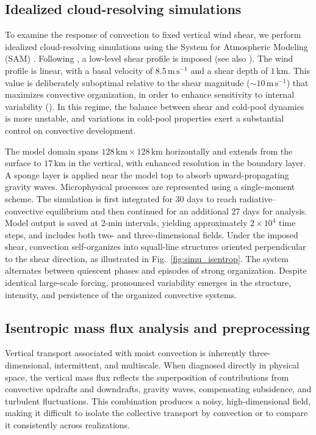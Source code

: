\documentclass[11pt]{article}
\begin{document}
\subsection{Idealized cloud-resolving simulations}

To examine the response of convection to fixed vertical wind shear, we perform idealized cloud-resolving simulations using the System for Atmospheric Modeling (SAM) \cite{khairoutdinov2003}. Following \cite{muller2013impact}, a low-level shear profile is imposed (see also \cite{rotunno1988theory, houze1977structure, robe2001effect}). The wind profile is linear, with a basal velocity of $8.5\,\mathrm{m\,s^{-1}}$ and a shear depth of $1\,\mathrm{km}$. This value is deliberately suboptimal relative to the shear magnitude ($\sim10\,\mathrm{m\,s^{-1}}$) that maximizes convective organization, in order to enhance sensitivity to internal variability (\cite{abramian2022shear}). In this regime, the balance between shear and cold-pool dynamics is more unstable, and variations in cold-pool properties exert a substantial control on convective development.

The model domain spans $128\,\mathrm{km} \times 128\,\mathrm{km}$ horizontally and extends from the surface to $17\,\mathrm{km}$ in the vertical, with enhanced resolution in the boundary layer. A sponge layer is applied near the model top to absorb upward-propagating gravity waves. Microphysical processes are represented using a single-moment scheme. The simulation is first integrated for 30 days to reach radiative--convective equilibrium and then continued for an additional 27 days for analysis. Model output is saved at 2-min intervals, yielding approximately $2\times10^{4}$ time steps, and includes both two- and three-dimensional fields. Under the imposed shear, convection self-organizes into squall-line structures oriented perpendicular to the shear direction, as illustrated in Fig.~\ref{fig:simu_isentrop}. The system alternates between quiescent phases and episodes of strong organization. Despite identical large-scale forcing, pronounced variability emerges in the structure, intensity, and persistence of the organized convective systems.

\subsection{Isentropic mass flux analysis and preprocessing}

Vertical transport associated with moist convection is inherently three-dimensional, intermittent, and multiscale. When diagnosed directly in physical space, the vertical mass flux reflects the superposition of contributions from convective updrafts and downdrafts, gravity waves, compensating subsidence, and turbulent fluctuations. This combination produces a noisy, high-dimensional field, making it difficult to isolate the collective transport by convection or to compare it consistently across realizations.
\end{document}
